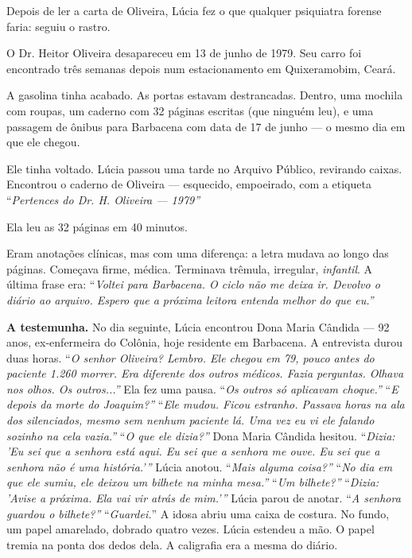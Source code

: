 \noindent Depois de ler a carta de Oliveira, Lúcia fez o que qualquer psiquiatra forense faria: seguiu o rastro.

\noindent O Dr. Heitor Oliveira desapareceu em 13 de junho de 1979. Seu carro foi encontrado três semanas depois num estacionamento em Quixeramobim, Ceará.

\noindent A gasolina tinha acabado. As portas estavam destrancadas. Dentro, uma mochila com roupas, um caderno com 32 páginas escritas (que ninguém leu), e uma passagem de ônibus para Barbacena com data de 17 de junho --- o mesmo dia em que ele chegou.

\noindent Ele tinha voltado.
\noindent Lúcia passou uma tarde no Arquivo Público, revirando caixas. Encontrou o caderno de Oliveira --- esquecido, empoeirado, com a etiqueta \textquotedblleft{\textit{Pertences do Dr. H. Oliveira --- 1979\textquotedblright}}

\noindent Ela leu as 32 páginas em 40 minutos.

\noindent Eram anotações clínicas, mas com uma diferença: a letra mudava ao longo das páginas. Começava firme, médica. Terminava trêmula, irregular, \textit{infantil}.
\noindent A última frase era:
\noindent \textquotedblleft{\textit{Voltei para Barbacena. O ciclo não me deixa ir. Devolvo o diário ao arquivo. Espero que a próxima leitora entenda melhor do que eu.\textquotedblright{}}}

\noindent \textbf{A testemunha.}
\noindent No dia seguinte, Lúcia encontrou Dona Maria Cândida --- 92 anos, ex-enfermeira do Colônia, hoje residente em Barbacena.
\noindent A entrevista durou duas horas.
\noindent \textquotedblleft{\textit{O senhor Oliveira? Lembro. Ele chegou em 79, pouco antes do paciente 1.260 morrer. Era diferente dos outros médicos. Fazia perguntas. Olhava nos olhos. Os outros...\textquotedblright{}} Ela fez uma pausa. }\textquotedblleft{\textit{Os outros só aplicavam choque.\textquotedblright{}}}
\noindent \textquotedblleft{\textit{E depois da morte do Joaquim?\textquotedblright{}}}
\noindent \textquotedblleft{\textit{Ele mudou. Ficou estranho. Passava horas na ala dos silenciados, mesmo sem nenhum paciente lá. Uma vez eu vi ele falando sozinho na cela vazia.\textquotedblright{}}}
\noindent \textquotedblleft{\textit{O que ele dizia?\textquotedblright{}}}
\noindent Dona Maria Cândida hesitou.
\noindent \textquotedblleft{\textit{Dizia: 'Eu sei que a senhora está aqui. Eu sei que a senhora me ouve. Eu sei que a senhora não é uma história.'\textquotedblright{}}}
\noindent Lúcia anotou.
\noindent \textquotedblleft{\textit{Mais alguma coisa?\textquotedblright{}}}
\noindent \textquotedblleft{\textit{No dia em que ele sumiu, ele deixou um bilhete na minha mesa.\textquotedblright{}}}
\noindent \textquotedblleft{\textit{Um bilhete?\textquotedblright{}}}
\noindent \textquotedblleft{\textit{Dizia: 'Avise a próxima. Ela vai vir atrás de mim.'\textquotedblright{}}}
\noindent Lúcia parou de anotar.
\noindent \textquotedblleft{\textit{A senhora guardou o bilhete?\textquotedblright{}}}
\noindent \textquotedblleft{\textit{Guardei.}\textquotedblright} A idosa abriu uma caixa de costura. No fundo, um papel amarelado, dobrado quatro vezes.
\noindent Lúcia estendeu a mão. O papel tremia na ponta dos dedos dela.
\noindent A caligrafia era a mesma do diário.


